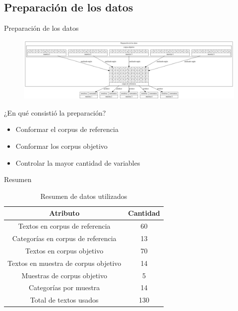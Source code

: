 \documentclass[presentation]{beamer}
\begin{document}
\subsection{Preparación de los datos}
\label{sec:org2ea26e9}
\begin{frame}[label={sec:orge08c990}]{Preparación de los datos}
\begin{figure}
\includegraphics[width=\textwidth]{./assets/preparacion_visualizacion.png}
\end{figure}

\begin{block}{¿En qué consistió la preparación?}
\begin{itemize}
\item Conformar el corpus de referencia
\item Conformar los corpus objetivo
\item Controlar la mayor cantidad de variables
\end{itemize}
\end{block}
\end{frame}
\begin{frame}[label={sec:org3c5bd2f}]{Resumen}
     \begin{table}[!ht]
    \centering

    \begin{tabular}{|c|c|}
    \hline
      Atributo & Cantidad \\ \hline
      Textos en corpus de referencia & 60 \\ \hline
      Categorías en corpus de referencia  & 13 \\ \hline
     Textos en corpus objetivo & 70 \\ \hline
     Textos en muestra de corpus objetivo & 14 \\ \hline
     Muestras de corpus objetivo & 5 \\ \hline
     Categorías por muestra & 14  \\ \hline
     Total de textos usados & 130  \\ \hline
    \end{tabular}
\caption{Resumen de datos utilizados}
\label{tab:resumen_preparacion}
\end{table}
\end{frame}
\end{document}
